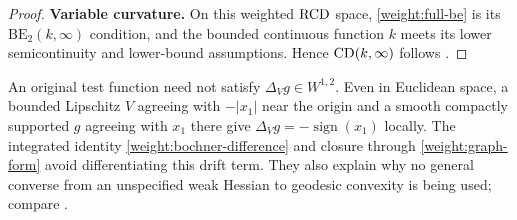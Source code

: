 \begin{proof}
\smallskip\noindent\textbf{Variable curvature.}
On this weighted \(\mathrm{RCD}\) space, \eqref{weight:full-be} is its
\(\mathrm{BE}_2(k,\infty)\) condition, and the bounded continuous
function \(k\) meets its lower semicontinuity and lower-bound
assumptions. Hence \(\mathrm{CD}(k,\infty)\) follows
\cite[Definition~1.4 and Theorem~1.1]{BHS2021}.
\end{proof}

\begin{remark}
\label{weight:domain-warning}
An original test function need not satisfy
\(\Delta_Vg\in W^{1,2}\). Even in Euclidean space, a bounded
Lipschitz \(V\) agreeing with \(-|x_1|\) near the origin and a
smooth compactly supported \(g\) agreeing with \(x_1\) there
give \(\Delta_Vg=-\operatorname{sign}(x_1)\) locally.
The integrated identity \eqref{weight:bochner-difference} and
closure through \eqref{weight:graph-form} avoid differentiating
this drift term. They also explain why no general converse from
an unspecified weak Hessian to geodesic convexity is being used;
compare \cite[Remark~2.4]{BrenaGigli2024}.
\end{remark}

